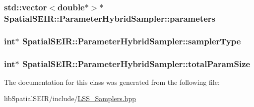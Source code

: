 \hypertarget{classSpatialSEIR_1_1ParameterHybridSampler_a78b4981910745b46803a7257e6cdc348}{
\subsubsection[{parameters}]{\setlength{\rightskip}{0pt plus 5cm}std\-::vector$<$double$\ast$$>$$\ast$ Spatial\-S\-E\-I\-R\-::\-Parameter\-Hybrid\-Sampler\-::parameters}}\label{classSpatialSEIR_1_1ParameterHybridSampler_a78b4981910745b46803a7257e6cdc348}
\hypertarget{classSpatialSEIR_1_1ParameterHybridSampler_a09803b093b9f8864fc8923d41c25c5d5}{
\subsubsection[{sampler\-Type}]{\setlength{\rightskip}{0pt plus 5cm}int$\ast$ Spatial\-S\-E\-I\-R\-::\-Parameter\-Hybrid\-Sampler\-::sampler\-Type}}\label{classSpatialSEIR_1_1ParameterHybridSampler_a09803b093b9f8864fc8923d41c25c5d5}
\hypertarget{classSpatialSEIR_1_1ParameterHybridSampler_a0b875aabb2a3ea61945bc5354bfd151f}{
\subsubsection[{total\-Param\-Size}]{\setlength{\rightskip}{0pt plus 5cm}int$\ast$ Spatial\-S\-E\-I\-R\-::\-Parameter\-Hybrid\-Sampler\-::total\-Param\-Size}}\label{classSpatialSEIR_1_1ParameterHybridSampler_a0b875aabb2a3ea61945bc5354bfd151f}


The documentation for this class was generated from the following file\-:\begin{DoxyCompactItemize}
\item 
lib\-Spatial\-S\-E\-I\-R/include/\hyperlink{LSS__Samplers_8hpp}{L\-S\-S\-\_\-\-Samplers.\-hpp}\end{DoxyCompactItemize}

